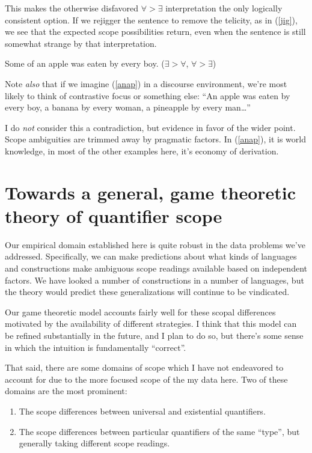 \documentclass{article}
\begin{document}
This makes the otherwise disfavored $\forall>\exists$ interpretation the only logically consistent option. If we rejigger the sentence to remove the telicity, as in (\ref{jig}), we see that the expected scope possibilities return, even when the sentence is still somewhat strange by that interpretation.

\begin{exe}
\ex Some of an apple was eaten by every boy. \hfill ($\exists>\forall$, $\forall>\exists$)\label{jig}
\end{exe}

Note \emph{also} that if we imagine (\ref{anap}) in a discourse environment, we're most likely to think of contrastive focus or something else: ``An apple was eaten by every boy, a banana by every woman, a pineapple by every man\ldots''

I do \emph{not} consider this a contradiction, but evidence in favor of the wider point.
Scope ambiguities are trimmed away by pragmatic factors. In (\ref{anap}), it is world knowledge, in most of the other examples here, it's economy of derivation.

\section{Towards a general, game theoretic theory of quantifier scope}

Our empirical domain established here is quite robust in the data problems we've addressed.
Specifically, we can make predictions about what kinds of languages and constructions make ambiguous scope readings available based on independent factors.
We have looked a number of constructions in a number of languages, but the theory would predict these generalizations will continue to be vindicated.

Our game theoretic model accounts fairly well for these scopal differences motivated by the availability of different strategies.
I think that this model can be refined substantially in the future, and I plan to do so, but there's some sense in which the intuition is fundamentally ``correct''.

That said, there are some domains of scope which I have not endeavored to account for due to the more focused scope of the my data here.
Two of these domains are the most prominent:

\begin{enumerate}
	\item The scope differences between universal and existential quantifiers.
	\item The scope differences between particular quantifiers of the same ``type'', but generally taking different scope readings.
\end{enumerate}
\end{document}
